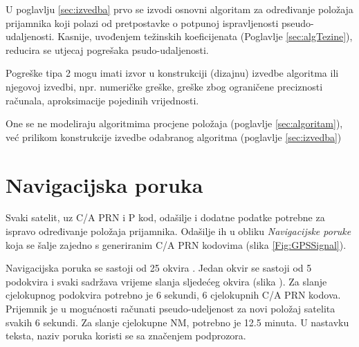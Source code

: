 \documentclass[a4paper,twoside,12pt]{memoir} %
\begin{document}
	U poglavlju \ref{sec:izvedba} prvo se izvodi osnovni algoritam za određivanje položaja 
	prijamnika koji polazi od pretpostavke o potpunoj ispravljenosti pseudo-udaljenosti\label{stranica:greskaOvisisamoOxOpravdano}.
	Kasnije, uvođenjem težinskih koeficijenata (Poglavlje \ref{sec:algTezine}), reducira se utjecaj pogrešaka
	psudo-udaljenosti.
	
	\vspace{0.5cm}
	Pogreške tipa 2 mogu imati izvor u konstrukciji (dizajnu) izvedbe algoritma ili njegovoj izvedbi, npr.
	numeričke greške, greške zbog ograničene preciznosti računala,
	aproksimacije pojedinih vrijednosti.
	
	One se ne modeliraju algoritmima procjene položaja (poglavlje \ref{sec:algoritam}), već prilikom konstrukcije izvedbe odabranog algoritma (poglavlje \ref{sec:izvedba})
 	
	
	\section{Navigacijska poruka}\label{sec:NM} %
	Svaki satelit, uz C/A PRN i P kod, odašilje i dodatne podatke potrebne za ispravo određivanje položaja prijamnika. Odašilje ih u obliku \textit{Navigacijske poruke} koja se šalje zajedno s generiranim C/A PRN kodovima (slika \ref{Fig:GPSSignal}).
	
	Navigacijska poruka se sastoji od 25 okvira \cite{ref:34}.
	Jedan okvir se sastoji od 5 podokvira i svaki sadržava vrijeme slanja
	sljedećeg okvira (slika \cite{GPS:1}). Za slanje cjelokupnog podokvira potrebno je 6 sekundi,
	6 cjelokupnih C/A PRN kodova. Prijemnik je u mogućnosti računati pseudo-udeljenost za novi položaj satelita svakih
	6 sekundi.
	Za slanje cjelokupne NM, potrebno je 12.5 minuta.
	U nastavku teksta, naziv poruka koristi se sa značenjem podprozora.
	\vspace{0.5cm}
	
\end{document}
